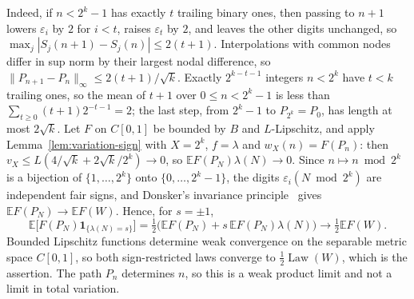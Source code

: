 \documentclass[11pt]{amsart}
\theoremstyle{definition}
\theoremstyle{remark}
\newcommand{\E}{\mathbb E}
\newcommand{\one}{\mathbf 1}
\begin{document}
Indeed, if $n<2^k-1$ has exactly $t$ trailing binary ones, then passing to $n+1$ lowers $\varepsilon_i$ by $2$ for $i<t$, raises $\varepsilon_t$ by $2$, and leaves the other digits unchanged, so $\max_j|S_j(n+1)-S_j(n)|\le2(t+1)$. Interpolations with common nodes differ in sup norm by their largest nodal difference, so $\|P_{n+1}-P_n\|_\infty\le2(t+1)/\sqrt k$. Exactly $2^{k-t-1}$ integers $n<2^k$ have $t<k$ trailing ones, so the mean of $t+1$ over $0\le n<2^k-1$ is less than $\sum_{t\ge0}(t+1)2^{-t-1}=2$; the last step, from $2^k-1$ to $P_{2^k}=P_0$, has length at most $2\sqrt k$. Let $F$ on $C[0,1]$ be bounded by $B$ and $L$-Lipschitz, and apply Lemma~\ref{lem:variation-sign} with $X=2^k$, $f=\lambda$ and $w_X(n)=F(P_n)$: then $v_X\le L(4/\sqrt k+2\sqrt k/2^k)\to0$, so $\E F(P_N)\lambda(N)\to0$. Since $n\mapsto n\bmod2^k$ is a bijection of $\{1,\ldots,2^k\}$ onto $\{0,\ldots,2^k-1\}$, the digits $\varepsilon_i(N\bmod2^k)$ are independent fair signs, and Donsker's invariance principle~\cite{Donsker1951} gives $\E F(P_N)\to\E F(W)$. Hence, for $s=\pm1$,
\[
 \E\bigl[F(P_N)\one_{\{\lambda(N)=s\}}\bigr]
 =\tfrac12\bigl(\E F(P_N)+s\,\E F(P_N)\lambda(N)\bigr)\longrightarrow\tfrac12\E F(W).
\]
Bounded Lipschitz functions determine weak convergence on the separable metric space $C[0,1]$, so both sign-restricted laws converge to $\frac12\operatorname{Law}(W)$, which is the assertion. The path $P_n$ determines $n$, so this is a weak product limit and not a limit in total variation.
\end{document}
